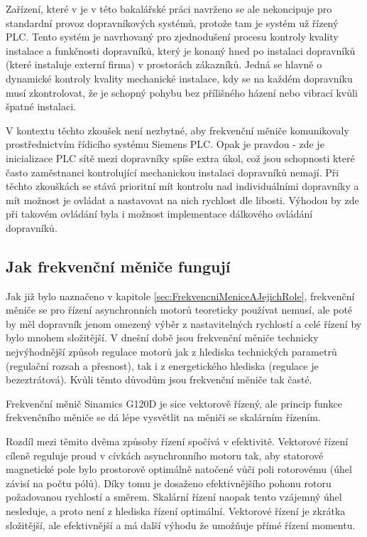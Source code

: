 Zařízení, které v je v této bakalářské práci navrženo se ale nekoncipuje pro standardní provoz dopravníkových systémů, protože tam je systém už řízený PLC. Tento systém je navrhovaný pro zjednodušení procesu kontroly kvality instalace a funkčnosti dopravníků, který je konaný hned po instalaci dopravníků (které instaluje externí firma) v prostorách zákazníků. Jedná se hlavně o dynamické kontroly kvality mechanické instalace, kdy se na každém dopravníku musí zkontrolovat, že je schopný pohybu bez přílišného házení nebo vibrací kvůli špatné instalaci.

V kontextu těchto zkoušek není nezbytné, aby frekvenční měniče komunikovaly prostřednictvím řídicího systému Siemens PLC. Opak je pravdou - zde je inicializace PLC sítě mezi dopravníky spíše extra úkol, což jsou schopnosti které často zaměstnanci kontrolující mechanickou instalaci dopravníků nemají. Při těchto zkouškách se stává prioritní mít kontrolu nad individuálními dopravníky a mít možnost je ovládat a nastavovat na nich rychlost dle libosti. Výhodou by zde při takovém ovládání byla i možnost implementace dálkového ovládání dopravníků.

\subsection{Jak frekvenční měniče fungují}\label{sec:JakFungujiFrekvencniMenice}

Jak již bylo naznačeno v kapitole \ref{sec:FrekvencniMeniceAJejichRole}, frekvenční měniče se pro řízení asynchronních motorů teoreticky používat nemusí, ale poté by měl dopravník jenom omezený výběr z nastavitelných rychlostí a celé řízení by bylo mnohem složitější. V dnešní době jsou frekvenční měniče technicky nejvýhodnější způsob regulace motorů jak z hlediska technických parametrů (regulační rozsah a přesnost), tak i z energetického hlediska (regulace je bezeztrátová). Kvůli těmto důvodům jsou frekvenční měniče tak časté.  \cite{FrekvencniMeniceZeSkriptElektrickeRegulovanePohony}

Frekvenční měnič Sinamics G120D je sice vektorově řízený, ale princip funkce frekvenčního měniče se dá lépe vysvětlit na měniči se skalárním řízením.

Rozdíl mezi těmito dvěma způsoby řízení spočívá v efektivitě. Vektorové řízení cíleně reguluje proud v cívkách asynchronního motoru tak, aby statorové magnetické pole bylo prostorově optimálně natočené vůči poli rotorovému (úhel závisí na počtu pólů). Díky tomu je dosaženo efektivnějšího pohonu rotoru požadovanou rychlostí a směrem. Skalární řízení naopak tento vzájemný úhel nesleduje, a proto není z hlediska řízení optimální. Vektorové řízení je zkrátka složitější, ale efektivnější a má další výhodu že umožňuje přímé řízení momentu.
\cite{FrekvencniMeniceZeSkriptElektrickeRegulovanePohony}

